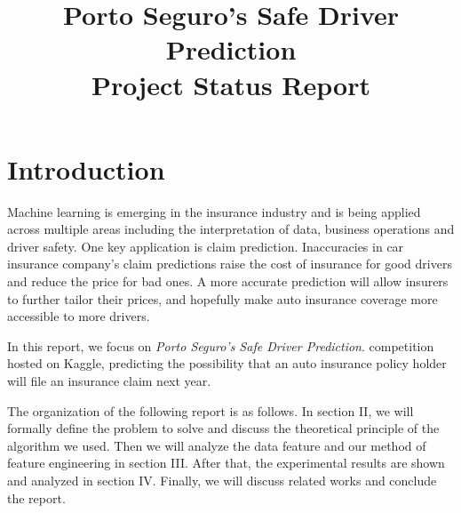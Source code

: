 \documentclass[conference,draft]{IEEEtran}
\begin{document}
\title{Porto Seguro's Safe Driver Prediction\\Project Status Report}
\author{
}

\maketitle

\section{Introduction}


Machine learning is emerging in the insurance industry and is being applied
across multiple areas including the interpretation of data, business operations
and driver safety. One key application is claim prediction. Inaccuracies in car
insurance company's claim predictions raise the cost of insurance for good
drivers and reduce the price for bad ones. A more accurate prediction will
allow insurers to further tailor their prices, and hopefully make auto
insurance coverage more accessible to more drivers.

In this report, we focus on \emph{Porto Seguro's Safe Driver Prediction}\cite{Domingos:2012:FUT:2347736.2347755}.
competition hosted on Kaggle, predicting the possibility that an auto insurance
policy holder will file an insurance claim next year.

The organization of the following report is as follows. In section II, we will
formally define the problem to solve and discuss the theoretical principle of
the algorithm we used. Then we will analyze the data feature and our method of
feature engineering in section III. After that, the experimental results are
shown and analyzed in section IV. Finally, we will discuss related works and
conclude the report.
\end{document}
